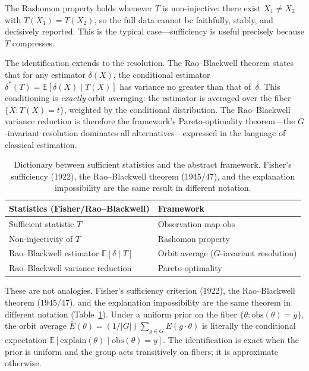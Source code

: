 \documentclass[11pt,a4paper]{article}
\newcommand{\E}{\mathbb{E}}
\begin{document}
The Rashomon property holds whenever $T$ is non-injective: there exist
$X_1 \neq X_2$ with $T(X_1) = T(X_2)$, so the full data cannot be
faithfully, stably, and decisively reported.  This is the typical
case---sufficiency is useful precisely because $T$ compresses.

The identification extends to the resolution.  The Rao--Blackwell theorem
\citep{rao1945information, blackwell1947conditional} states that for any
estimator $\delta(X)$, the conditional estimator
$\delta^*(T) = \E[\delta(X) \mid T(X)]$ has variance no greater than that
of~$\delta$.  This conditioning is \emph{exactly} orbit averaging: the
estimator is averaged over the fiber $\{X : T(X) = t\}$, weighted by the
conditional distribution.  The Rao--Blackwell variance reduction is therefore
the framework's Pareto-optimality theorem---the $G$-invariant resolution
dominates all alternatives---expressed in the language of classical
estimation.

\begin{table}[t]
  \centering
  \small
  \begin{tabular}{@{}ll@{}}
    \toprule
    \textbf{Statistics (Fisher/Rao--Blackwell)} & \textbf{Framework} \\
    \midrule
    Sufficient statistic $T$ & Observation map $\mathrm{obs}$ \\
    Non-injectivity of $T$ & Rashomon property \\
    Rao--Blackwell estimator $\E[\delta \mid T]$ & Orbit average ($G$-invariant resolution) \\
    Rao--Blackwell variance reduction & Pareto-optimality \\
    \bottomrule
  \end{tabular}
  \caption{Dictionary between sufficient statistics and the abstract framework.
    Fisher's sufficiency (1922), the Rao--Blackwell theorem (1945/47), and the
    explanation impossibility are the same result in different notation.}
  \label{tab:sufficiency-dictionary}
\end{table}

These are not analogies.  Fisher's sufficiency criterion (1922), the
Rao--Blackwell theorem (1945/47), and the explanation impossibility are the
same theorem in different notation (Table~\ref{tab:sufficiency-dictionary}).
Under a uniform prior on the fiber $\{\theta : \mathrm{obs}(\theta) = y\}$, the orbit average $\bar{E}(\theta) = (1/|G|)\sum_{g \in G} E(g \cdot \theta)$ is literally the conditional expectation $\E[\mathrm{explain}(\theta) \mid \mathrm{obs}(\theta) = y]$.  The identification is exact when the prior is uniform and the group acts transitively on fibers; it is approximate otherwise.
\end{document}
